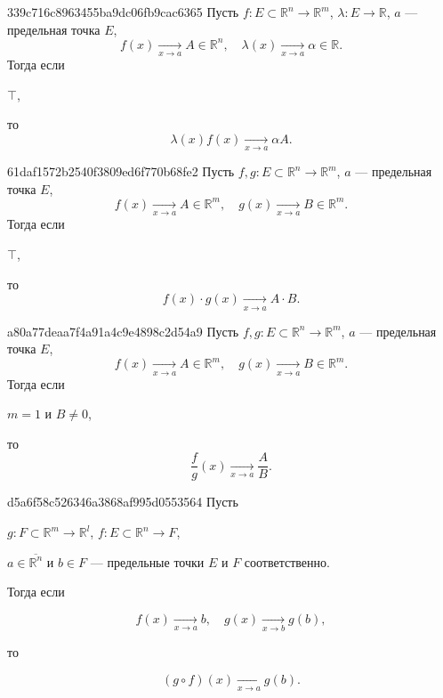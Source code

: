 \begin{note}{339c716c8963455ba9dc06fb9cac6365}
    Пусть \({ f : E \subset  \mathbb R^{n} \to \mathbb R^{m} }\),\: \({ \lambda : E \to \mathbb R }\),\: \({ a }\) --- предельная точка \({ E }\),
    \[
        f(x) \underset{x \to a}\longrightarrow A \in \mathbb R^{n}, \quad \lambda(x) \underset{x \to a}\longrightarrow \alpha \in \mathbb R.
    \]
    Тогда если \begin{icloze}{1}\({ \top }\),\end{icloze} то
    \[
        \lambda(x) f(x) \underset{x \to a}\longrightarrow \alpha A.
    \]
\end{note}

\begin{note}{61daf1572b2540f3809ed6f770b68fe2}
    Пусть \({ f, g : E \subset \mathbb R^{n} \to \mathbb R^{m} }\),\: \({ a }\) --- предельная точка \({ E }\),
    \[
        f(x) \underset{x \to a}\longrightarrow A \in \mathbb R^{m}, \quad g(x) \underset{x \to a}\longrightarrow B \in \mathbb R^{m}.
    \]
    Тогда если \begin{icloze}{1}\({ \top }\),\end{icloze} то
    \[
        f(x) \cdot g(x) \underset{x \to a}\longrightarrow A \cdot B.
    \]
\end{note}

\begin{note}{a80a77deaa7f4a91a4c9e4898c2d54a9}
    Пусть \({ f, g : E \subset \mathbb R^{n} \to \mathbb R^{m} }\),\: \({ a }\) --- предельная точка \({ E }\),
    \[
        f(x) \underset{x \to a}\longrightarrow A \in \mathbb R^{m}, \quad g(x) \underset{x \to a}\longrightarrow B \in \mathbb R^{m}.
    \]
    Тогда если \begin{icloze}{1}\({ m = 1 }\) и \({ B \neq 0 }\),\end{icloze} то
    \[
        \frac{f}{g}(x) \underset{x \to a}\longrightarrow \frac{A}{B}.
    \]
\end{note}

\begin{note}{d5a6f58c526346a3868af995d0553564}
    Пусть \begin{icloze}{4}\({ g : F \subset \mathbb R^{m} \to \mathbb R^{l} }\),\: \({ f : E \subset \mathbb R^{n} \to F }\),\end{icloze}\: \begin{icloze}{3}\({ a \in \overline{\mathbb R^{n}} }\) и \({ b \in F }\) --- предельные точки \({ E }\) и \({ F }\) соответственно.\end{icloze} Тогда если
    \begin{icloze}{2}
        \[
            f(x) \underset{x \to a}\longrightarrow b, \quad g(x) \underset{x \to b}\longrightarrow g(b),
        \]
    \end{icloze}
    то
    \begin{icloze}{1}
        \[
            (g \circ f)(x) \underset{x \to a}\longrightarrow g(b).
        \]
    \end{icloze}
\end{note}


